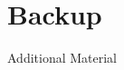 \documentclass{beamer}
\begin{document}
\section{Backup}
\begin{frame}
  \begin{center}
    {\Large Additional Material}
  \end{center}
\end{frame}




\setcounter{framenumber}{14}
\end{document}
